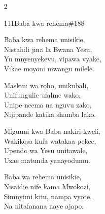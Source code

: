 \documentclass{article}
\begin{document}
\begin{multicols}{2}
\begin{hymn}{111}{Baba kwa rehema}{\#188}
\begin{stanza}
Baba kwa rehema unisikie,\\
Nistahili jina la Bwana Yesu,\\
Yu mnyenyekevu, vipawa vyake,\\
Vikae moyoni mwangu milele.
\end{stanza}
\begin{stanza}
Maskini wa roho, unikubali,\\
Unifungulie ufalme wako,\\
Unipe neema na nguvu zako,\\
Nijipande katika shamba lako.
\end{stanza}
\begin{stanza}
Miguuni kwa Baba nakiri kweli,\\
Wakikosa kufa watakaa pekee,\\
Upendo wa Yesu unitawale,\\
Uzae matunda yanayodumu.
\end{stanza}
\begin{stanza}
Baba wa rehema unisikie,\\
Nisaidie nife kama Mwokozi,\\
Simnyimi kitu, nampa vyote,\\
Na nitafanana naye ajapo.
\end{stanza}
\end{hymn}


\end{multicols}
\end{document}
